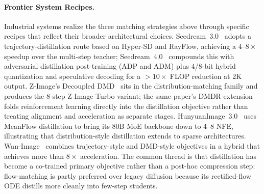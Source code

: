 \documentclass{llmxive}
\begin{document}
\paragraph{Frontier System Recipes.}
{Industrial systems realize the three matching strategies above through specific recipes that reflect their broader architectural choices. Seedream~3.0~\citep{gao2025seedream} adopts a trajectory-distillation route based on Hyper-SD and RayFlow, achieving a $4$--$8\times$ speedup over the multi-step teacher; Seedream~4.0~\citep{seedream2025seedream} compounds this with adversarial distillation post-training (ADP and ADM) plus 4/8-bit hybrid quantization and speculative decoding for a $>10\times$ FLOP reduction at 2K output. Z-Image's Decoupled DMD~\citep{cai2025z} sits in the distribution-matching family and produces the 8-step Z-Image-Turbo variant; the same paper's DMDR extension folds reinforcement learning directly into the distillation objective rather than treating alignment and acceleration as separate stages. HunyuanImage~3.0~\citep{cao2025hunyuanimage} uses MeanFlow distillation to bring its 80B MoE backbone down to 4--8 NFE, illustrating that distribution-style distillation extends to sparse architectures. Wan-Image~\citep{mao2026wan} combines trajectory-style and DMD-style objectives in a hybrid that achieves more than $8\times$ acceleration. The common thread is that distillation has become a co-trained primary objective rather than a post-hoc compression step: flow-matching is partly preferred over legacy diffusion because its rectified-flow ODE distills more cleanly into few-step students.}
\end{document}
